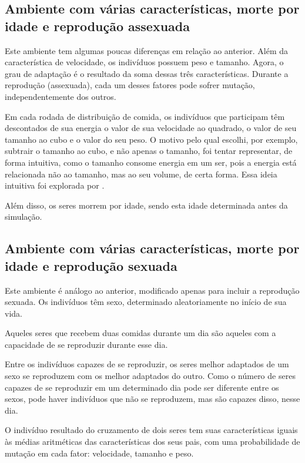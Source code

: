 \documentclass[10pt,brazil,english]{article}
\begin{document}
            \subsection{Ambiente com várias características, morte por idade e reprodução assexuada}
            
                Este ambiente tem algumas poucas diferenças em relação ao anterior. Além da característica de velocidade, os indivíduos possuem peso e tamanho. Agora, o grau de adaptação é o resultado da soma dessas três características. Durante a reprodução (assexuada), cada um desses fatores pode sofrer mutação, independentemente dos outros.
                
                Em cada rodada de distribuição de comida, os indivíduos que participam têm descontados de sua energia o valor de sua velocidade ao quadrado, o valor de seu tamanho ao cubo e o valor do seu peso. O motivo pelo qual escolhi, por exemplo, subtrair o tamanho ao cubo, e não apenas o tamanho, foi tentar representar, de forma intuitiva, como o tamanho consome energia em um ser, pois a energia está relacionada não ao tamanho, mas ao seu volume, de certa forma. Essa ideia intuitiva foi explorada por .
                
                Além disso, os seres morrem por idade, sendo esta idade determinada antes da simulação.
            
            \subsection{Ambiente com várias características, morte por idade e reprodução sexuada}
            
                Este ambiente é análogo ao anterior, modificado apenas para incluir a reprodução sexuada. Os indivíduos têm sexo, determinado aleatoriamente no início de sua vida.
                
                Aqueles seres que recebem duas comidas durante um dia são aqueles com a capacidade de se reproduzir durante esse dia.
                
                Entre os indivíduos capazes de se reproduzir, os seres melhor adaptados de um sexo se reproduzem com os melhor adaptados do outro. Como o número de seres capazes de se reproduzir em um determinado dia pode ser diferente entre os sexos, pode haver indivíduos que não se reproduzem, mas são capazes disso, nesse dia.
                
                O indivíduo resultado do cruzamento de dois seres tem suas características iguais às médias aritméticas das características dos seus pais, com uma probabilidade de mutação em cada fator: velocidade, tamanho e peso.
    
\end{document}
